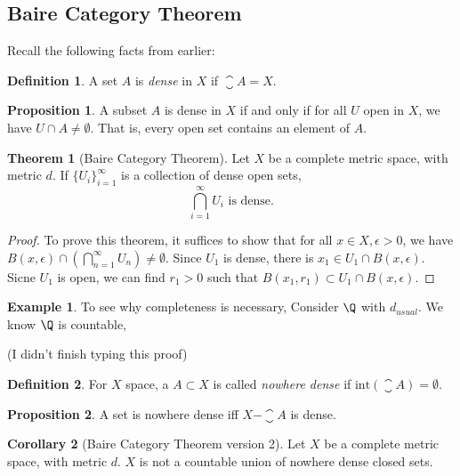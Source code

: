 \documentclass[a5paper]{article}
\theoremstyle{definition}%
\newtheorem{theorem}{Theorem}
\newtheorem{corollary}[theorem]{Corollary}
\newtheorem*{proposition*}{Proposition}
\newtheorem*{definition*}{Definition}
\newtheorem*{example*}{Example}
\numberwithin{exercise}{section}
\theoremstyle{remark}%
\begin{document}
\subsection{Baire Category Theorem}

Recall the following facts from earlier:
\begin{definition*}
A set $A$ is \emph{dense} in $X$ if $\closure{A}=X$.
\end{definition*}
\begin{proposition*}
A subset $A$ is dense in $X$ if and only if for all $U$ open in $X$, we have $U\cap A\neq\emptyset$. That is, every open set contains an element of $A$. 
\end{proposition*}

\begin{highlight}
\begin{theorem}[Baire Category Theorem]
Let $X$ be a complete metric space, with metric $d$. If $\{U_i\}_{i=1}^\infty$ is a collection of dense open sets, 
$$\bigcap_{i=1}^\infty U_i \text{ is dense.}$$
\end{theorem}
\end{highlight}
\begin{proof}
To prove this theorem, it suffices to show that for all $x\in X, \epsilon>0$, we have $B(x,\epsilon)\cap (\bigcap_{n=1}^\infty U_n)\neq\emptyset$. Since $U_1$ is dense, there is $x_1\in U_1\cap B(x,\epsilon)$. Sicne $U_1$ is open, we can find $r_1>0$ such that $B(x_1,r_1)\subset U_1\cap B(x,\epsilon)$. 
\end{proof}

\begin{example*}
To see why completeness is necessary, Consider $\Q$ with $d_{usual}$. We know $\Q$ is countable,

(I didn't finish typing this proof)
\end{example*}

\begin{definition*}
For $X$ space, a $A\subset X$ is called \emph{nowhere dense} if $\text{int}(\closure{A})=\emptyset$. 
\end{definition*}

\begin{proposition*}
A set is nowhere dense iff $X-\closure{A}$ is dense.
\end{proposition*}

\begin{highlight}
\begin{corollary}[Baire Category Theorem version 2]
Let $X$ be a complete metric space, with metric $d$. $X$ is not a countable union of nowhere dense closed sets. 
\end{corollary}
\end{highlight}
\end{document}
